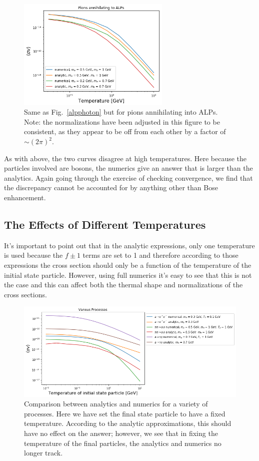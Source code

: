 \documentclass[superscriptaddress,nofootinbib,notitlepage,onecolumn]{revtex4-1}
\begin{document}
 \begin{figure}[h!]
\includegraphics[width=0.65\textwidth]{annihilation.png}
\caption{Same as Fig.~\ref{alpphoton} but for pions annihilating into ALPs. Note: the normalizations have been adjusted in this figure to be consistent, as they appear to be off from each other by a factor of $\sim(2 \pi)^2$.}
\end{figure}
As with above, the two curves disagree at high temperatures. Here because the particles involved are bosons, the numerics give an answer that is larger than the analytics. Again going through the exercise of checking convergence, we find that the discrepancy cannot be accounted for by anything other than Bose enhancement.

\subsection{The Effects of Different Temperatures}
It's important to point out that in the analytic expressions, only one temperature is used because the $f\pm1$ terms are set to 1 and therefore according to those expressions the cross section should only be a function of the temperature of the initial state particle. However, using full numerics it's easy to see that this is not the case and this can affect both the thermal shape and normalizations of the cross sections.
 \begin{figure}[h!]
\includegraphics[width=\textwidth]{difftemp.png}
\caption{Comparison between analytics and numerics for a variety of processes. Here we have set the final state particle to have a fixed temperature. According to the analytic approximations, this should have no effect on the answer; however, we see that in fixing the temperature of the final particles, the analytics and numerics no longer track.}
\end{figure}
\end{document}
